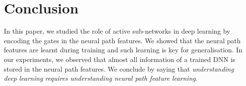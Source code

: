 \section{Conclusion}
\begin{comment}
Optimisation and generalisation of DNNs has been an important question in machine learning. Prior works have considered the \emph{neural tangent features} (NTF) and an associated \emph{neural tangent kernel} (NTK), which are quantities based on the first-order gradient information.  In this paper, we looked at fully connected DNNs with ReLU activations, and for such networks, we defined a novel feature namely the \emph{neural path feature} (NPF) and an associated \emph{neural path kernel} , which are \emph{zeroth-order} quantities. The NPFs are based on the information in the gates of a DNN, and hence the NPFs change as the network is trained. We theoretically showed that NPK can be used to understand the optimisation and generalisation for models trained with fixed NPFs. We showed in the experiments that in standard DNNs with ReLU activations, NPFs are learnt during training, and such NPF learning is key for generalisation performance. We also showed via experiments that deep gated networks, where NPFs are learned in a decoupled manner also generalise well. 

A possible future direction is to understand the role of depth and width in NPF learning, and the role of NPF in generalisation. The deep gated network might be useful in this effort, since the NPFs learning is decoupled and is perhaps amenable to analysis in comparison the standard DNNs.
\end{comment}
In this paper, we studied the role of active sub-networks in deep learning by encoding the gates in the neural path features. We showed that the neural path features are learnt during training and such learning is key for generalisation. In our experiments, we observed that almost all information of a trained DNN is stored in the neural path features. We conclude by saying that \emph{understanding deep learning requires understanding neural path feature learning}. %
